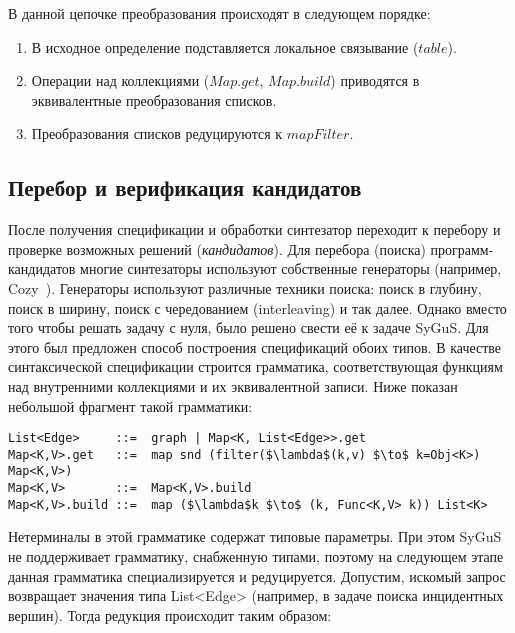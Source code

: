 \documentclass[14pt]{matmex-diploma-custom}
\begin{document}
В данной цепочке преобразования происходят в следующем порядке:
\begin{enumerate}
    \item В исходное определение подставляется локальное связывание ($table$).
    \item Операции над коллекциями ($Map.get$, $Map.build$) приводятся в эквивалентные преобразования списков.
    \item Преобразования списков редуцируются к $mapFilter$.
\end{enumerate}


\subsection{Перебор и верификация кандидатов}
После получения спецификации и обработки синтезатор переходит к перебору и проверке возможных решений (\textit{кандидатов}). Для перебора (поиска) программ-кандидатов многие синтезаторы используют собственные генераторы (например, Cozy~\cite{Cozy}). Генераторы используют различные техники поиска: поиск в глубину, поиск в ширину, поиск с чередованием (interleaving) и так далее.
Однако вместо того чтобы решать задачу с нуля, было решено свести её к задаче SyGuS. Для этого был предложен способ построения спецификаций обоих типов. В качестве синтаксической спецификации строится грамматика, соответствующая функциям над внутренними коллекциями и их эквивалентной записи. Ниже показан небольшой фрагмент такой грамматики:

\begin{lstlisting}[language=SyGuSLang, mathescape=true]
List<Edge>     ::=  graph | Map<K, List<Edge>>.get
Map<K,V>.get   ::=  map snd (filter($\lambda$(k,v) $\to$ k=Obj<K>) Map<K,V>)
Map<K,V>       ::=  Map<K,V>.build
Map<K,V>.build ::=  map ($\lambda$k $\to$ (k, Func<K,V> k)) List<K>
\end{lstlisting}

Нетерминалы в этой грамматике содержат типовые параметры. При этом SyGuS не поддерживает грамматику, снабженную типами, поэтому на следующем этапе данная грамматика специализируется и редуцируется. Допустим, искомый запрос возвращает значения типа List<Edge> (например, в задаче поиска инцидентных вершин). Тогда редукция происходит таким образом:
\end{document}
